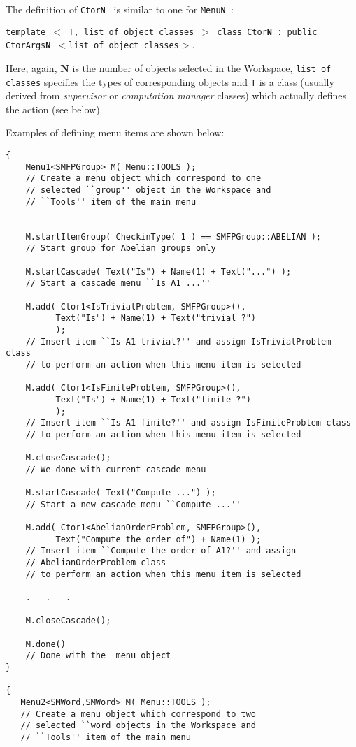 \documentclass[12pt]{article}
\begin{document}
The definition of {\tt Ctor\textbf{N} } is similar to one for
{\tt Menu\textbf{N} }:
\begin{center}
{\tt template $<$ T, list of object classes $>$ class Ctor\textbf{N} : public
CtorArgs\textbf{N}
$<$list of object classes$>$}.
\end{center}
Here, again, {\bf N} is the number of objects
selected in the Workspace, {\tt list of classes} specifies the types 
of corresponding
objects and {\tt T}  is a class (usually derived from {\em supervisor} or
{\em computation manager} classes) which actually defines the action (see
below).


Examples of defining menu items are shown below:
\footnotesize
\begin{verbatim}
{
    Menu1<SMFPGroup> M( Menu::TOOLS );
    // Create a menu object which correspond to one
    // selected ``group'' object in the Workspace and
    // ``Tools'' item of the main menu


    M.startItemGroup( CheckinType( 1 ) == SMFPGroup::ABELIAN );
    // Start group for Abelian groups only

    M.startCascade( Text("Is") + Name(1) + Text("...") );
    // Start a cascade menu ``Is A1 ...''

    M.add( Ctor1<IsTrivialProblem, SMFPGroup>(),
          Text("Is") + Name(1) + Text("trivial ?")
          );
    // Insert item ``Is A1 trivial?'' and assign IsTrivialProblem class
    // to perform an action when this menu item is selected

    M.add( Ctor1<IsFiniteProblem, SMFPGroup>(),
          Text("Is") + Name(1) + Text("finite ?")
          );
    // Insert item ``Is A1 finite?'' and assign IsFiniteProblem class
    // to perform an action when this menu item is selected

    M.closeCascade();
    // We done with current cascade menu

    M.startCascade( Text("Compute ...") );
    // Start a new cascade menu ``Compute ...''

    M.add( Ctor1<AbelianOrderProblem, SMFPGroup>(),
          Text("Compute the order of") + Name(1) );
    // Insert item ``Compute the order of A1?'' and assign
    // AbelianOrderProblem class
    // to perform an action when this menu item is selected

    .   .   .

    M.closeCascade();

    M.done()
    // Done with the  menu object
}

{
   Menu2<SMWord,SMWord> M( Menu::TOOLS );
   // Create a menu object which correspond to two
   // selected ``word objects in the Workspace and
   // ``Tools'' item of the main menu


\end{verbatim}
\end{document}
